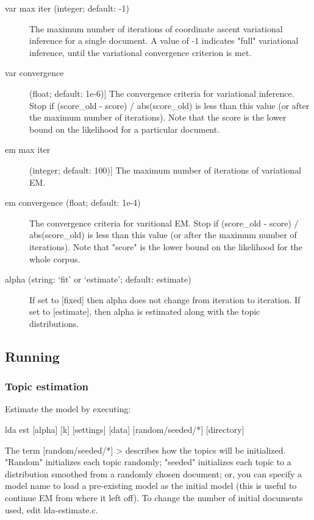 \begin{description}
	\item[var max iter (integer; default: -1)]
	The maximum number of iterations of coordinate ascent variational
	inference for a single document.  A value of -1 indicates "full"
	variational inference, until the variational convergence
	criterion is met.

	\item[var convergence] (float; default: 1e-6)]
	The convergence criteria for variational inference.  Stop if
	(score_old - score) / abs(score_old) is less than this value (or
	after the maximum number of iterations).  Note that the score is
	the lower bound on the likelihood for a particular document.

	\item[em max iter] (integer; default: 100)]
	The maximum number of iterations of variational EM.

	\item[em convergence (float; default: 1e-4)]
	The convergence criteria for varitional EM.  Stop if (score_old -
	score) / abs(score_old) is less than this value (or after the
	maximum number of iterations).  Note that "score" is the lower
	bound on the likelihood for the whole corpus.

	\item[alpha (string: `fit' or `estimate'; default: estimate)]
	If set to [fixed] then alpha does not change from iteration to
	iteration.  If set to [estimate], then alpha is estimated along
	with the topic distributions.   
\end{description}


\subsection{Running}

\subsubsection{Topic estimation}

Estimate the model by executing:

     lda est [alpha] [k] [settings] [data] [random/seeded/*] [directory]

The term [random/seeded/*] > describes how the topics will be
initialized.  "Random" initializes each topic randomly; "seeded"
initializes each topic to a distribution smoothed from a randomly
chosen document; or, you can specify a model name to load a
pre-existing model as the initial model (this is useful to continue EM
from where it left off).  To change the number of initial documents
used, edit lda-estimate.c.

